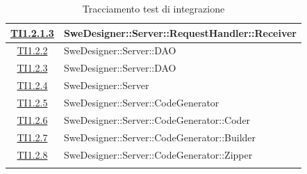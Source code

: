 \documentclass[../PianoDiQualifica.tex]{subfiles}
\begin{document}
\begin{longtable}{|c|l|}
		\hline
		\hyperlink{TI1.2.1.3}{TI1.2.1.3} & SweDesigner::Server::RequestHandler::Receiver \\
		\hline
		\hyperlink{TI1.2.2}{TI1.2.2} & SweDesigner::Server::DAO \\
		\hline
		\hyperlink{TI1.2.3}{TI1.2.3} & SweDesigner::Server::DAO \\
		\hline
		\hyperlink{TI1.2.4}{TI1.2.4} & SweDesigner::Server \\
		\hline
		\hyperlink{TI1.2.5}{TI1.2.5} & SweDesigner::Server::CodeGenerator \\
		\hline
		\hyperlink{TI1.2.6}{TI1.2.6} & SweDesigner::Server::CodeGenerator::Coder \\
		\hline
		\hyperlink{TI1.2.7}{TI1.2.7} & SweDesigner::Server::CodeGenerator::Builder \\
		\hline
		\hyperlink{TI1.2.8}{TI1.2.8} & SweDesigner::Server::CodeGenerator::Zipper \\
		\hline
		\caption[Tracciamento test di integrazione]{Tracciamento test di integrazione}
		\label{tabella:TracciamentoTestIntegrazione}
	\end{longtable}
\end{document}
